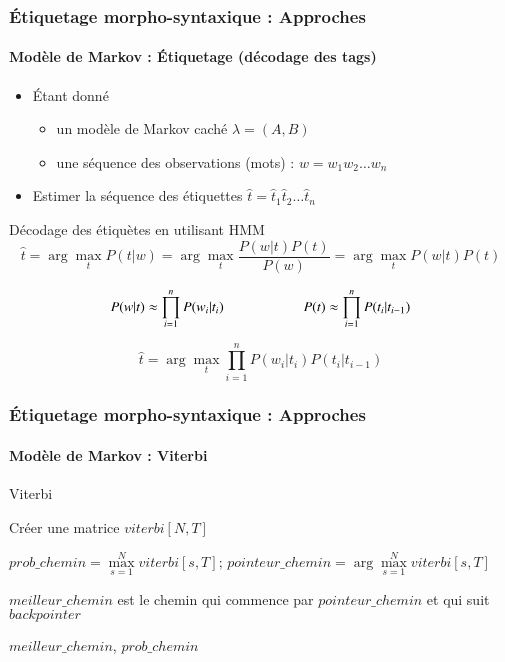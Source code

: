 \documentclass[xcolor=table]{beamer}
\begin{document}
\begin{frame}
\frametitle{Étiquetage morpho-syntaxique : Approches}
\framesubtitle{Modèle de Markov : Étiquetage (décodage des tags)}

\begin{itemize}
	\item Étant donné 
	\begin{itemize}
		\item un modèle de Markov caché $\lambda = (A, B)$
		\item une séquence des observations (mots) : $w = w_1 w_2 \ldots w_n$
	\end{itemize}
	\item Estimer la séquence des étiquettes $\hat{t} = \hat{t}_1 \hat{t}_2 \ldots \hat{t}_n$
\end{itemize}

\begin{block}{Décodage des étiquètes en utilisant HMM}
	\[
	\hat{t} = \arg\max\limits_t P(t | w) = \arg\max\limits_t \frac{P(w|t) P(t)}{P(w)} = \arg\max\limits_t P(w|t) P(t)%
	\]
	
	\[ 
	P(w | t) \approx \prod\limits_{i=1}^n P(w_i|t_i) 
	\hskip2cm
	P(t) \approx \prod\limits_{i=1}^n P(t_i|t_{i-1}) 
	\]
	
	\[
	\hat{t} = \arg\max\limits_t \prod\limits_{i=1}^n P(w_i|t_i) P(t_i|t_{i-1})
	\]
\end{block}

\end{frame}

\begin{frame}
\frametitle{Étiquetage morpho-syntaxique : Approches}
\framesubtitle{Modèle de Markov : Viterbi}
\vspace{-6pt}
\begin{block}{Viterbi }
	\scriptsize
	\begin{algorithm}[H]
		
		Créer une matrice $viterbi[N, T]$\;
		
		
	
		$prob\_chemin = \max\limits_{s=1}^N viterbi[s, T];\, pointeur\_chemin = \arg\max\limits_{s=1}^N viterbi[s, T]$\;
		
		$meilleur\_chemin$ est le chemin qui commence par $pointeur\_chemin$ et qui suit $backpointer$
		
		\Return $meilleur\_chemin$, $prob\_chemin$\;
		
	\end{algorithm}
\end{block}

\end{frame}
\end{document}
